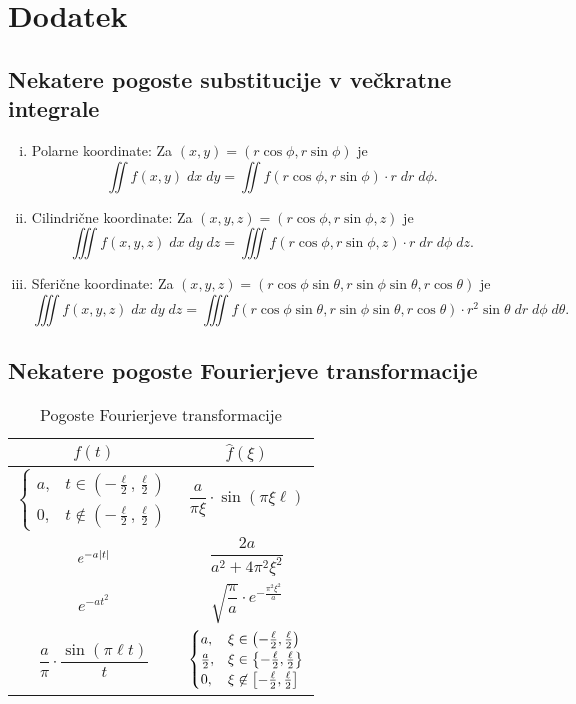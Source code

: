 \section{Dodatek}

\renewcommand{\thesubsection}{\Alph{subsection}}
\renewcommand{\arraystretch}{2.5}

\subsection{Nekatere pogoste substitucije v večkratne integrale}

\begin{enumerate}[i)]
\item Polarne koordinate:
Za $(x, y) = (r\cos\phi, r\sin\phi)$ je
\[
\iint f(x, y)\;dx\;dy =
\iint f(r\cos\phi, r\sin\phi) \cdot r\;dr\;d\phi.
\]
\item Cilindrične koordinate:
Za $(x, y, z) = (r\cos\phi, r\sin\phi, z)$ je
\[
\iiint f(x, y, z)\;dx\;dy\;dz =
\iiint f(r\cos\phi, r\sin\phi, z) \cdot r\;dr\;d\phi\;dz.
\]
\item Sferične koordinate:
Za $(x, y, z) =
(r\cos\phi\sin\theta, r\sin\phi\sin\theta, r\cos\theta)$
je
\[
\iiint f(x, y, z)\;dx\;dy\;dz =
\iiint f(r\cos\phi\sin\theta, r\sin\phi\sin\theta, r\cos\theta)
\cdot r^2 \sin \theta \;dr\;d\phi\;d\theta.
\]
\end{enumerate}

\newpage

\subsection{Nekatere pogoste Fourierjeve transformacije}

\begin{table}[!h]
\centering
\caption{Pogoste Fourierjeve transformacije}
\begin{tabular}{c|c}
$f(t)$ & $\hat{f}(\xi)$
\\ 
\hline 
$\displaystyle \begin{cases}
a, & t \in \left(-\frac{\ell}{2},\frac{\ell}{2}\right)
\\
0, & t \not\in \left(-\frac{\ell}{2},\frac{\ell}{2}\right)
\end{cases}$
&
$\dfrac{a}{\pi \xi} \cdot \sin(\pi \xi \ell)$
\\ 
\hline 
$e^{-a \left\lvert t\right\rvert}$
&
$\dfrac{2a}{a^2 + 4 \pi^2 \xi^2}$
\\ 
\hline 
$e^{-a t^2}$
&
$\sqrt{\dfrac{\pi}{a}} \cdot e^{-\frac{\pi^2 \xi^2}{a}}$
\\ 
\hline 
$\dfrac{a}{\pi} \cdot \dfrac{\sin(\pi \ell t)}{t}$
&
$\begin{cases}
a, & \xi \in \left(-\frac{\ell}{2},\frac{\ell}{2}\right)
\\
\frac{a}{2}, & \xi \in \left\{-\frac{\ell}{2},\frac{\ell}{2}\right\}
\\
0, & \xi \not\in \left[-\frac{\ell}{2},\frac{\ell}{2}\right]
\end{cases}$
\end{tabular} 
\end{table}
